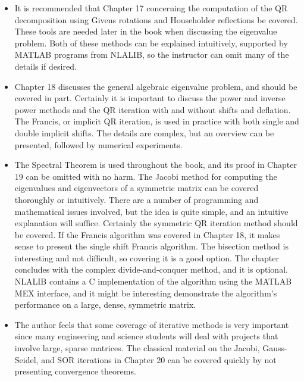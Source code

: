 \documentclass[../main.tex]{subfiles}
\begin{document}
\begin{itemize}[noitemsep]
	\item It is recommended that Chapter 17 concerning the computation of the QR decomposition using Givens rotations and Householder reflections be covered. These tools are needed later in the book when discussing the eigenvalue problem. Both of these methods can be explained intuitively, supported by MATLAB programs from NLALIB, so the instructor can omit many of the details if desired.

	\item Chapter 18 discusses the general algebraic eigenvalue problem, and should be covered in part. Certainly it is important to discuss the power and inverse power methods and the QR iteration with and without shifts and deflation. The Francis, or implicit QR iteration, is used in practice with both single and double implicit shifts. The details are complex, but an overview can be presented, followed by numerical experiments.

	\item The Spectral Theorem is used throughout the book, and its proof in Chapter 19 can be omitted with no harm. The Jacobi method for computing the eigenvalues and eigenvectors of a symmetric matrix can be covered thoroughly or intuitively. There are a number of programming and mathematical issues involved, but the idea is quite simple, and an intuitive explanation will suffice. Certainly the symmetric QR iteration method should be covered. If the Francis algorithm was covered in Chapter 18, it makes sense to present the single shift Francis algorithm. The bisection method is interesting and not difficult, so covering it is a good option. The chapter concludes with the complex divide-and-conquer method, and it is optional. NLALIB contains a C implementation of the algorithm using the MATLAB MEX interface, and it might be interesting demonstrate the algorithm’s performance on a large, dense, symmetric matrix.

	\item The author feels that some coverage of iterative methods is very important since many engineering and science students will deal with projects that involve large, sparse matrices. The classical material on the Jacobi, Gauss-Seidel, and SOR iterations in Chapter 20 can be covered quickly by not presenting convergence theorems.


\end{itemize}
\end{document}

